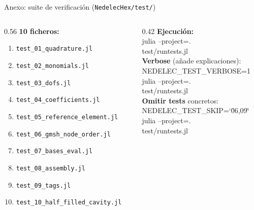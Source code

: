 \documentclass{beamer}
\begin{document}
\begin{frame}{Anexo: suite de verificación (\texttt{NedelecHex/test/})}
  \small
  \begin{columns}[T]
    \begin{column}{0.56\textwidth}
      \textbf{10 ficheros:}
      \begin{enumerate}\setlength\itemsep{1pt}\scriptsize
        \item \texttt{test\_01\_quadrature.jl}
        \item \texttt{test\_02\_monomials.jl}
        \item \texttt{test\_03\_dofs.jl}
        \item \texttt{test\_04\_coefficients.jl}
        \item \texttt{test\_05\_reference\_element.jl}
        \item \texttt{test\_06\_gmsh\_node\_order.jl}
        \item \texttt{test\_07\_bases\_eval.jl}
        \item \texttt{test\_08\_assembly.jl}
        \item \texttt{test\_09\_tags.jl}
        \item \texttt{test\_10\_half\_filled\_cavity.jl}
      \end{enumerate}
    \end{column}
    \begin{column}{0.42\textwidth}
      \textbf{Ejecución:}\\[2pt]
      {\ttfamily\scriptsize julia --project=.}\\
      {\ttfamily\scriptsize \hspace*{1em}test/runtests.jl}\\[6pt]
      \textbf{Verbose} (añade explicaciones):\\[2pt]
      {\ttfamily\scriptsize NEDELEC\_TEST\_VERBOSE=1}\\
      {\ttfamily\scriptsize julia --project=.}\\
      {\ttfamily\scriptsize \hspace*{1em}test/runtests.jl}\\[6pt]
      \textbf{Omitir tests} concretos:\\[2pt]
      {\ttfamily\scriptsize NEDELEC\_TEST\_SKIP=\char`\"06,09\char`\"}\\
      {\ttfamily\scriptsize julia --project=.}\\
      {\ttfamily\scriptsize \hspace*{1em}test/runtests.jl}
    \end{column}
  \end{columns}
\end{frame}
\end{document}
